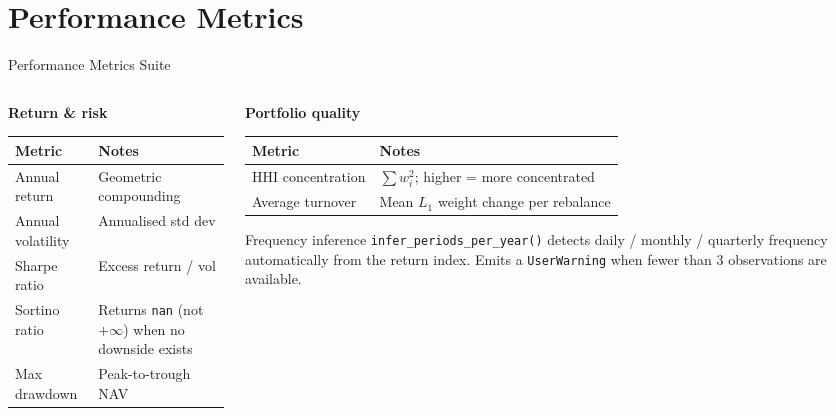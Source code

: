 \documentclass[aspectratio=169, 10pt]{beamer}
\begin{document}
\section{Performance Metrics}

\begin{frame}{Performance Metrics Suite}

  \begin{columns}[T]
    \begin{column}{0.48\textwidth}
      \textbf{Return \& risk}
      \medskip

      \begin{tabular}{@{}L{3.2cm} L{4.2cm}@{}}
        \toprule
        Metric & Notes \\
        \midrule
        Annual return    & Geometric compounding \\
        Annual volatility& Annualised std dev \\
        Sharpe ratio     & Excess return / vol \\
        Sortino ratio    & Returns \texttt{nan} (not $+\infty$) when no downside exists \\
        Max drawdown     & Peak-to-trough NAV \\
        \bottomrule
      \end{tabular}
    \end{column}

    \begin{column}{0.48\textwidth}
      \textbf{Portfolio quality}
      \medskip

      \begin{tabular}{@{}L{3.2cm} L{4.2cm}@{}}
        \toprule
        Metric & Notes \\
        \midrule
        HHI concentration & $\sum w_i^2$; higher = more concentrated \\
        Average turnover  & Mean $L_1$ weight change per rebalance \\
        \bottomrule
      \end{tabular}

      \bigskip
      \begin{block}{Frequency inference}
        \small
        \texttt{infer\_periods\_per\_year()} detects
        daily / monthly / quarterly frequency
        automatically from the return index.
        Emits a \texttt{UserWarning} when fewer
        than 3 observations are available.
      \end{block}
    \end{column}
  \end{columns}
\end{frame}
\end{document}
